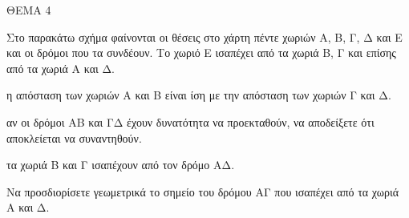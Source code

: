 
ΘΕΜΑ 4

Στο παρακάτω σχήμα φαίνονται οι θέσεις στο χάρτη πέντε χωριών Α, Β, Γ, Δ και Ε και οι δρόμοι που τα συνδέουν. Το χωριό Ε ισαπέχει από τα χωριά Β, Γ και επίσης από τα χωριά Α και Δ.

\begin{alist}
\item Να αποδείξετε ότι:

.}
\end{alist}
\begin{alist}
\item
  η απόσταση των χωριών Α και Β είναι ίση με την απόσταση των χωριών Γ και Δ. 
\item
  αν οι δρόμοι ΑΒ και ΓΔ έχουν δυνατότητα να προεκταθούν, να αποδείξετε ότι αποκλείεται να συναντηθούν. 
\item
  τα χωριά Β και Γ ισαπέχουν από τον δρόμο ΑΔ. 

\item Να προσδιορίσετε γεωμετρικά το σημείο του δρόμου ΑΓ που ισαπέχει από τα χωριά Α και Δ. 


\end{alist}
